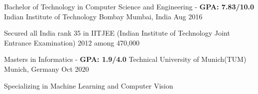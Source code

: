 
\begin{cventries}
  	
  	\cventry
    {Bachelor of Technology in Computer Science and Engineering - \textbf{GPA: 7.83/10.0}} %
    {Indian Institute of Technology Bombay} %
    {Mumbai, India} %
    {Aug 2016} %
    {
		\begin{cvitems}
			\item {Secured all India rank 35 in IITJEE (Indian Institute of Technology Joint Entrance Examination) 2012 among 470,000}
		\end{cvitems}
    }
	
	\cventry
	{Masters in Informatics - \textbf{GPA: 1.9/4.0}} %
	{Technical University of Munich(TUM)} %
	{Munich, Germany} %
	{Oct 2020} %
	{
		\begin{cvitems}
			\item {Specializing in Machine Learning and Computer Vision}
		\end{cvitems}
	}

\end{cventries}
